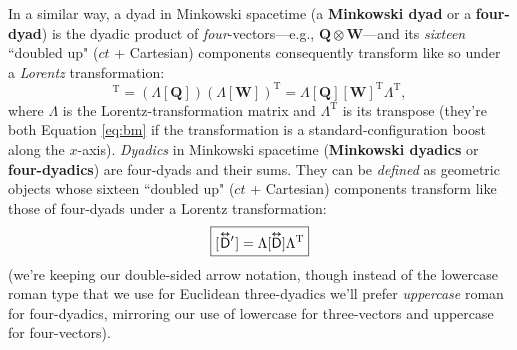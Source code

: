 \documentclass[12pt]{article}
\renewcommand{\vv}[1]{\mathbf{#1}}
\newcommand{\capdy}[1]{ \overset{ \text{\tiny$\bm\leftrightarrow$} }{\vphantom{\text{\small{A}}}\smash{#1}} }
\begin{document}
In a similar way, a dyad in Minkowski spacetime (a \textbf{Minkowski dyad} or a \textbf{four-dyad}) is the dyadic product of \emph{four}-vectors---e.g., $\vv Q \otimes \vv W$---and its \emph{sixteen} ``doubled up" ($ct$ + Cartesian) components consequently transform like so under a \emph{Lorentz} transformation:
\begin{equation*}
[\vv Q^\prime \mkern1mu ] [\vv W^\prime \mkern1mu ]^{\mathrm{T}} = ( \Lambda [\vv Q] ) ( \Lambda [\vv W] )^\mathrm{T} = \Lambda [\vv Q] [\vv W]^{\mathrm{T}} \Lambda^{\mathrm{T}} ,
\end{equation*}
where $\Lambda$ is the Lorentz-transformation matrix and $\Lambda^{\mathrm{T}}$ is its transpose (they're both Equation \ref{eq:bm} if the transformation is a standard-configuration boost along the $x$-axis). \emph{Dyadics} in Minkowski spacetime (\textbf{Minkowski dyadics} or \textbf{four-dyadics}) are four-dyads and their sums. They can be \emph{defined} as geometric objects whose sixteen ``doubled up" ($ct$ + Cartesian) components transform like those of four-dyads under a Lorentz transformation:
\begin{equation}\label{eq:ltd}
\boxed{ [ \mkern1mu {\capdy{\mathsf{D}} {\vphantom{D}}^\prime} \mkern1mu ] = \Lambda [ \capdy{\mathsf{D}} ] \Lambda^{\mathrm{T}}}
\end{equation}
(we're keeping our double-sided arrow notation, though instead of the lowercase roman type that we use for Euclidean three-dyadics we'll prefer \emph{uppercase} roman for four-dyadics, mirroring our use of lowercase for three-vectors and uppercase for four-vectors).
\end{document}
